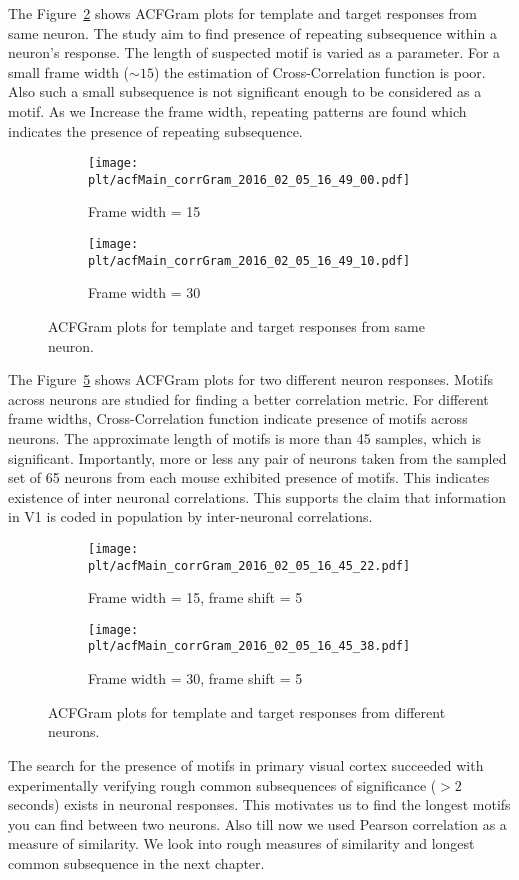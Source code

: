 \documentclass[MTech]{iitmdiss}
\newcommand{\plt}{thesis_plots}
\begin{document}
The Figure~\ref{fig:acfgram_same}  shows ACFGram plots for template and target responses from same neuron. The study aim to find presence of repeating subsequence within a neuron's response. The length of suspected motif is varied as a parameter.
For a small frame width ($\sim 15$) the estimation of Cross-Correlation function is poor. Also such a small subsequence is not significant enough to be considered as a motif. As we Increase the frame width, repeating patterns are found which indicates the presence of repeating subsequence.
\begin{figure}[h]
  \begin{subfigure}[b]{0.5\textwidth}
    \texttt{[image: \\plt/acfMain\_corrGram\_2016\_02\_05\_16\_49\_00.pdf]}
    \caption{Frame width = 15}
    \label{fig:ori_simple}
  \end{subfigure}%
  \begin{subfigure}[b]{0.5\textwidth}
    \texttt{[image: \\plt/acfMain\_corrGram\_2016\_02\_05\_16\_49\_10.pdf]}
    \caption{Frame width = 30}
    \label{fig:acfgram_same}
  \end{subfigure}%
  \caption{ACFGram plots for template and target responses from same neuron.}\label{fig:oridir_simple}
\end{figure}
The Figure~\ref{fig:acfgram_diff} shows ACFGram plots for two different neuron responses. Motifs across neurons are studied for finding a better correlation metric. For different frame widths, Cross-Correlation function indicate presence of motifs across neurons. The approximate length of motifs is more than 45 samples, which is significant. Importantly, more or less any pair of neurons taken from the sampled set of 65 neurons from each mouse exhibited presence of motifs. This indicates existence of inter neuronal correlations. This supports the claim that information in V1 is coded in population by inter-neuronal correlations.
\begin{figure}[h]
  \begin{subfigure}[b]{0.5\textwidth}
    \texttt{[image: \\plt/acfMain\_corrGram\_2016\_02\_05\_16\_45\_22.pdf]}
    \caption{Frame width = 15, frame shift = 5}
    \label{fig:ori_simple}
  \end{subfigure}%
  \begin{subfigure}[b]{0.5\textwidth}
    \texttt{[image: \\plt/acfMain\_corrGram\_2016\_02\_05\_16\_45\_38.pdf]}
    \caption{Frame width = 30, frame shift = 5}
    \label{fig:acfgram_diff}
  \end{subfigure}%
  \caption{ACFGram plots for template and target responses from different neurons.}\label{fig:oridir_simple}
\end{figure}
The search for the presence of motifs in primary visual cortex succeeded with experimentally verifying rough common subsequences of significance ($>2$ seconds) exists in neuronal responses. This motivates us to find the longest motifs you can find between two neurons. Also till now we used Pearson correlation as a measure of similarity. We look into rough measures of similarity and longest common subsequence in the next chapter.
\end{document}

